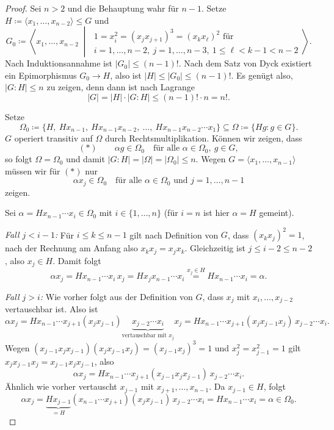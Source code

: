 \documentclass[11pt]{article}
\begin{document}
\begin{proof}
  Sei $n > 2$ und die Behauptung wahr für $n - 1$. Setze $H \coloneqq \langle x_1, \dots, x_{n-2} \rangle \le G$ und
  \[
    G_0 \coloneqq \left\langle x_1, \dots, x_{n-2} \;\middle|\;
    \begin{array}{l}
      1 = x_i^2 = (x_j x_{j+1})^3 = (x_k x_\ell)^2 \text{ für} \\[2pt]
      i = 1, \dots, n-2,\ j = 1, \dots, n-3,\ 1 \le \ell < k - 1 < n - 2
    \end{array}
    \right\rangle.
  \]
  Nach Induktionsannahme ist $\lvert G_0 \rvert \le (n-1)!$. Nach dem Satz von Dyck existiert ein Epimorphismus $G_0 \to H$, also ist $\lvert H \rvert \le \lvert G_0 \rvert \le (n-1)!$. Es genügt also, $\lvert G : H \rvert \le n$ zu zeigen, denn dann ist nach Lagrange
  \[ \lvert G \rvert = \lvert H \rvert \cdot \lvert G : H \rvert \le (n-1)! \cdot n = n!. \]

  Setze
  \[ \Omega_0 \coloneqq \{H,\ Hx_{n-1},\ Hx_{n-1}x_{n-2},\ \dots,\ Hx_{n-1}x_{n-2} \dotsm x_1\} \subseteq \Omega \coloneqq \{Hg : g \in G\}. \]
  $G$ operiert transitiv auf $\Omega$ durch Rechtsmultiplikation. Können wir zeigen, dass
  \[ (\ast) \qquad \alpha g \in \Omega_0 \quad \text{für alle } \alpha \in \Omega_0,\ g \in G, \]
  so folgt $\Omega = \Omega_0$ und damit $\lvert G : H \rvert = \lvert \Omega \rvert = \lvert \Omega_0 \rvert \le n$. Wegen $G = \langle x_1, \dots, x_{n-1} \rangle$ müssen wir für $(\ast)$ nur
  \[ \alpha x_j \in \Omega_0 \quad \text{für alle } \alpha \in \Omega_0 \text{ und } j = 1, \dots, n-1 \]
  zeigen.

  Sei $\alpha = Hx_{n-1} \dotsm x_i \in \Omega_0$ mit $i \in \{1, \dots, n\}$ (für $i = n$ ist hier $\alpha = H$ gemeint).


  \textit{Fall $j < i - 1$:} Für $i \le k \le n - 1$ gilt nach Definition von $G$, dass $(x_k x_j)^2 = 1$, nach der Rechnung am Anfang also $x_k x_j = x_j x_k$. Gleichzeitig ist $j \le i - 2 \le n - 2$, also $x_j \in H$. Damit folgt
  \[ \alpha x_j = H x_{n-1} \dotsm x_i\, x_j = H x_j x_{n-1} \dotsm x_i \overset{x_j \in H}{=} H x_{n-1} \dotsm x_i = \alpha. \]

  \textit{Fall $j > i$:} Wie vorher folgt aus der Definition von $G$, dass $x_j$ mit $x_i, \dots, x_{j-2}$ vertauschbar ist. Also ist
  \[ \alpha x_j = H x_{n-1} \dotsm x_{j+1} (x_j x_{j-1}) \underbrace{x_{j-2} \dotsm x_i}_{\text{vertauschbar mit } x_j} x_j = H x_{n-1} \dotsm x_{j+1} (x_j x_{j-1} x_j)\, x_{j-2} \dotsm x_i. \]
  Wegen $(x_{j-1} x_j x_{j-1})(x_j x_{j-1} x_j) = (x_{j-1} x_j)^3 = 1$ und $x_j^2 = x_{j-1}^2 = 1$ gilt $x_j x_{j-1} x_j = x_{j-1} x_j x_{j-1}$, also
  \[ \alpha x_j = H x_{n-1} \dotsm x_{j+1} (x_{j-1} x_j x_{j-1})\, x_{j-2} \dotsm x_i. \]
  Ähnlich wie vorher vertauscht $x_{j-1}$ mit $x_{j+1}, \dots, x_{n-1}$. Da $x_{j-1} \in H$, folgt
  \[ \alpha x_j = \underbrace{H x_{j-1}}_{= H} (x_{n-1} \dotsm x_{j+1})(x_j x_{j-1})\, x_{j-2} \dotsm x_i = H x_{n-1} \dotsm x_i = \alpha \in \Omega_0. \]


\end{proof}
\end{document}
